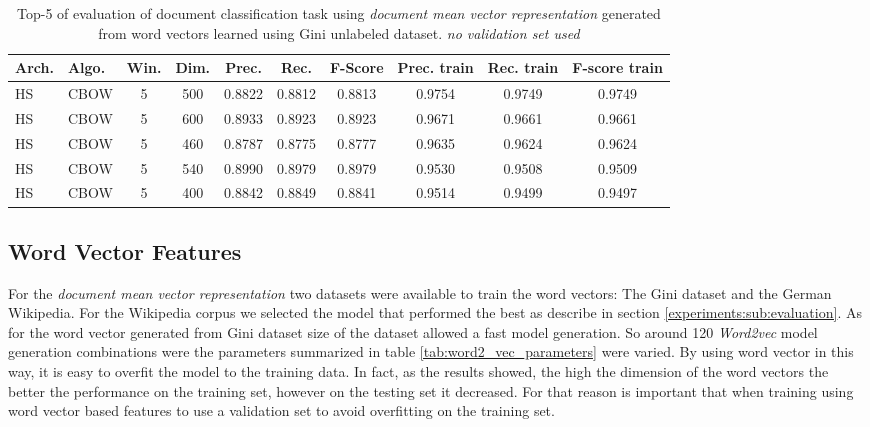 \begin{table}[!htbp] 

  \centering
  \caption{Top-5 of evaluation of document classification task using
    \textit{document mean vector representation} generated from word vectors learned
  using Gini unlabeled dataset. \textit{no validation set used}
 }
  \label{tab:w2v4tc_ginig_w2v_evaluation_no_validation}

\small
\begin{tabular}{|llcc|ccc|ccc|}
\hline
 Arch.  &  Algo.  &  Win.  &  Dim.  &  Prec.  &  Rec.  &  F-Score  &  Prec.
 train  &  Rec. train  &  F-score train  \\
\hline
 \ac{HS}       &  \ac{CBOW}  &       5  &   500  &     0.8822  &  0.8812  &    0.8813  &        0.9754  &       0.9749  &          0.9749  \\
 \ac{HS}       &  \ac{CBOW}  &       5  &   600  &     0.8933  &  0.8923  &    0.8923  &        0.9671  &       0.9661  &          0.9661  \\
 \ac{HS}       &  \ac{CBOW}  &       5  &   460  &     0.8787  &  0.8775  &    0.8777  &        0.9635  &       0.9624  &          0.9624  \\
 \ac{HS}       &  \ac{CBOW}  &       5  &   540  &     0.8990  &  0.8979  &    0.8979  &        0.9530  &       0.9508  &          0.9509  \\
 \ac{HS}       &  \ac{CBOW}  &       5  &   400  &     0.8842  &  0.8849  &
 0.8841  &        0.9514  &       0.9499  &          0.9497  \\
\hline
\end{tabular}
\end{table}



\subsection{Word Vector Features}

For the \textit{document mean vector representation} two datasets were available to
train the word vectors: The Gini dataset and the German Wikipedia.
 For the Wikipedia corpus we selected the model that
performed the best as describe in section \ref{experiments:sub:evaluation}. 
As for the word vector generated from Gini dataset 
size of the dataset  allowed a fast model generation. So around 120
\textit{Word2vec} model generation  combinations were the parameters
summarized in table \ref{tab:word2_vec_parameters} were varied. By using word
vector in this way, it is easy to overfit the model to the training data. In
fact, as the results showed, the high the dimension of the word vectors the
better the performance on the training set, however on the testing set it
decreased.  For that reason is important that when training using word vector
based features to use a validation set to avoid overfitting on the training
set. 

